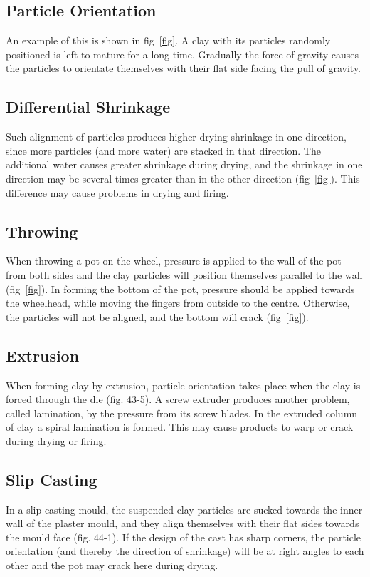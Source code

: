 \subsection{Particle Orientation}
An example of this is shown in fig~\ref{fig}. A clay with its particles 
randomly positioned is left to mature for a long time. Gradually the force of 
gravity causes the particles to orientate themselves with their flat side 
facing the pull of gravity.
\subsection{Differential Shrinkage}
Such alignment of particles produces higher drying shrinkage in one direction, 
since more particles (and more water) are stacked in that direction. The 
additional water causes greater shrinkage during drying, and the shrinkage in 
one direction may be several times greater than in the other direction 
(fig~\ref{fig}). This difference may cause problems in drying and firing.
\subsection{Throwing}
When throwing a pot on the wheel, pressure is applied to the wall of the pot 
from both sides and the clay particles will position themselves parallel to the 
wall (fig~\ref{fig}). In forming the bottom of the pot, pressure should be 
applied towards the wheelhead, while moving the fingers from outside to the 
centre. Otherwise, the particles will not be aligned, and the bottom will crack 
(fig~\ref{fig}).
\subsection{Extrusion}
When forming clay by extrusion, particle orientation takes place when the clay 
is forced through the die (fig. 43-5). A screw extruder produces another 
problem, called lamination, by the pressure from its screw blades. In the 
extruded column of clay a spiral lamination is formed. This may cause products 
to warp or crack during drying or firing.
\subsection{Slip Casting}
In a slip casting mould, the suspended clay particles are sucked towards the 
inner wall of the plaster mould, and they align themselves with their flat 
sides towards the mould face (fig. 44-1). If the design of the cast has sharp 
corners, the particle orientation (and thereby the direction of shrinkage) will 
be at right angles to each other and the pot may crack here during drying.
